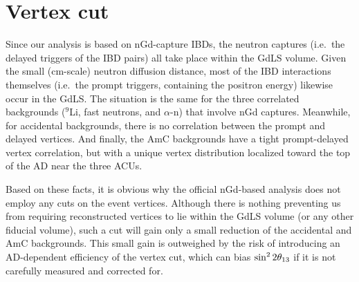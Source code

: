 \documentclass[../thesis.tex]{subfiles}
\begin{document}
\section{Vertex cut}
\label{sec:cutVaryVertexCut}

\begin{comment}
  XXX Do our adjustments of background rates account for the fact that some backgrounds can occur in the GdLS+LS whereas others occur only in GdLS?

Accidentals -- Handled automatically, no adjustment, we're good
Li9, fast-n, alpha-n: Only in GdLS, ???
AmC: Both. R distribution unknown but probably ``lumpy''. Z probably like what we did.
\end{comment}

Since our analysis is based on nGd-capture IBDs, the neutron captures (i.e.\ the delayed triggers of the IBD pairs) all take place within the GdLS volume. Given the small (cm-scale) neutron diffusion distance, most of the IBD interactions themselves (i.e.\ the prompt triggers, containing the positron energy) likewise occur in the GdLS.
The situation is the same for the three correlated backgrounds ($^9$Li, fast neutrons, and $\alpha$-n) that involve nGd captures.
%
Meanwhile, for accidental backgrounds, there is no correlation between the prompt and delayed vertices.
And finally, the AmC backgrounds have a tight prompt-delayed vertex correlation, but with a unique vertex distribution localized toward the top of the AD near the three ACUs.

Based on these facts, it is obvious why the official nGd-based analysis does not employ any cuts on the event vertices. Although there is nothing preventing us from requiring reconstructed vertices to lie within the GdLS volume (or any other fiducial volume), such a cut will gain only a small reduction of the accidental and AmC backgrounds. This small gain is outweighed by the risk of introducing an AD-dependent efficiency of the vertex cut, which can bias $\sin^2 2\theta_{13}$ if it is not carefully measured and corrected for.
\end{document}
